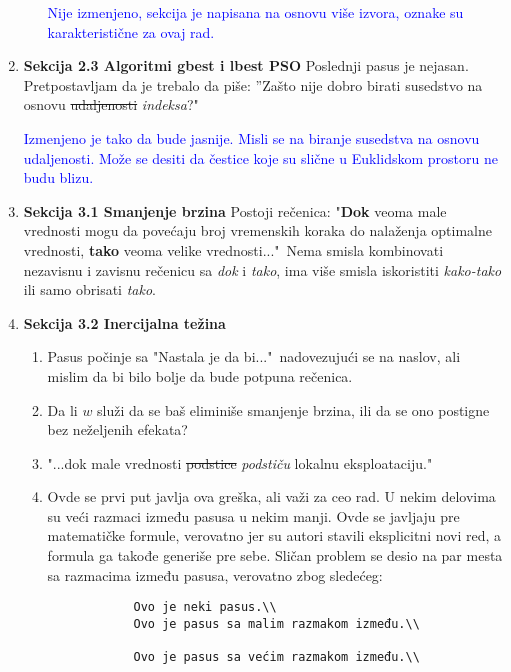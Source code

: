 \documentclass[a4paper]{report}
\newcommand{\odgovor}[1]{\textcolor{blue}{#1}}
\begin{document}
\begin{enumerate}
\begin{enumerate}
        \odgovor{Nije izmenjeno, sekcija je napisana na osnovu više izvora, oznake su karakteristične za ovaj rad.}
        
    \end{enumerate}
    
    \item \textbf{Sekcija 2.3 Algoritmi gbest i lbest PSO} Poslednji pasus je nejasan. Pretpostavljam da je trebalo da piše: ''Zašto nije dobro birati susedstvo na osnovu \st{udaljenosti} \textit{indeksa}?"

    \odgovor{Izmenjeno je tako da bude jasnije. Misli se na biranje susedstva na osnovu udaljenosti. Može se desiti da čestice koje su slične u Euklidskom prostoru ne budu blizu.}
    
    \item \textbf{Sekcija 3.1 Smanjenje brzina} Postoji rečenica: "\textbf{Dok} veoma male vrednosti mogu da povećaju broj vremenskih koraka do nalaženja optimalne vrednosti, \textbf{tako} veoma velike vrednosti..."\ Nema smisla kombinovati nezavisnu i zavisnu rečenicu sa \textit{dok} i \textit{tako}, ima više smisla iskoristiti \textit{kako-tako} ili samo obrisati \textit{tako}.
    
    \item \textbf{Sekcija 3.2 Inercijalna težina}
    \begin{enumerate}
        \item Pasus počinje sa "Nastala je da bi..."\ nadovezujući se na naslov, ali mislim da bi bilo bolje da bude potpuna rečenica.
        \item Da li $w$ služi da se baš eliminiše smanjenje brzina, ili da se ono postigne bez neželjenih efekata?
        \item "...dok male vrednosti \st{podstice} \textit{podstiču} lokalnu eksploataciju."
        \item Ovde se prvi put javlja ova greška, ali važi za ceo rad. U nekim delovima su veći razmaci između pasusa u nekim manji. Ovde se javljaju pre matematičke formule, verovatno jer su autori stavili eksplicitni novi red, a formula ga takođe generiše pre sebe. Sličan problem se desio na par mesta sa razmacima između pasusa, verovatno zbog sledećeg:
        \begin{verbatim}
            Ovo je neki pasus.\\
            Ovo je pasus sa malim razmakom između.\\
            
            Ovo je pasus sa većim razmakom između.\\
        \end{verbatim}
    \end{enumerate}
    

\end{enumerate}
\end{document}
